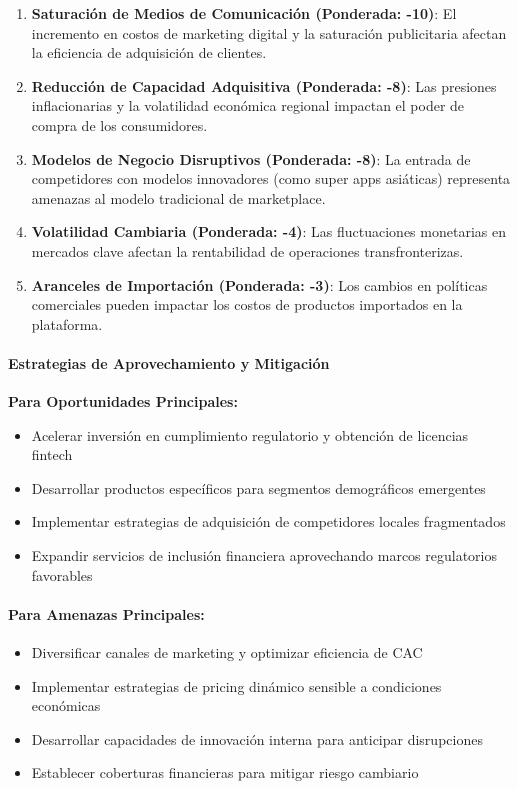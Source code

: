 \begin{enumerate}
\item \textbf{Saturación de Medios de Comunicación (Ponderada: -10)}: El incremento en costos de marketing digital y la saturación publicitaria afectan la eficiencia de adquisición de clientes.

\item \textbf{Reducción de Capacidad Adquisitiva (Ponderada: -8)}: Las presiones inflacionarias y la volatilidad económica regional impactan el poder de compra de los consumidores.

\item \textbf{Modelos de Negocio Disruptivos (Ponderada: -8)}: La entrada de competidores con modelos innovadores (como super apps asiáticas) representa amenazas al modelo tradicional de marketplace.

\item \textbf{Volatilidad Cambiaria (Ponderada: -4)}: Las fluctuaciones monetarias en mercados clave afectan la rentabilidad de operaciones transfronterizas.

\item \textbf{Aranceles de Importación (Ponderada: -3)}: Los cambios en políticas comerciales pueden impactar los costos de productos importados en la plataforma.
\end{enumerate}

\paragraph{Estrategias de Aprovechamiento y Mitigación}

\textbf{Para Oportunidades Principales:}
\begin{itemize}
\item Acelerar inversión en cumplimiento regulatorio y obtención de licencias fintech
\item Desarrollar productos específicos para segmentos demográficos emergentes
\item Implementar estrategias de adquisición de competidores locales fragmentados
\item Expandir servicios de inclusión financiera aprovechando marcos regulatorios favorables
\end{itemize}

\paragraph{Para Amenazas Principales:}
\begin{itemize}
\item Diversificar canales de marketing y optimizar eficiencia de CAC
\item Implementar estrategias de pricing dinámico sensible a condiciones económicas
\item Desarrollar capacidades de innovación interna para anticipar disrupciones
\item Establecer coberturas financieras para mitigar riesgo cambiario
\end{itemize}


